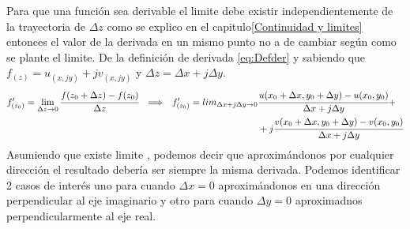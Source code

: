 Para que una función sea derivable el limite debe existir independientemente de la trayectoria de $\Delta z$ como se explico en el capitulo\ref{Continuidad y limites} entonces el valor de la derivada en un mismo punto no a de cambiar según como se plante el limite. De la definición de derivada \ref{eq:Defder} y sabiendo que  $f_{(z)}=u_{(x,jy)}+jv_{(x,jy)}$ y $\Delta z=\Delta x+j\Delta y$.
\begin{equation}
    \begin{aligned}
         f'_{(z_0)}=\lim_{\Delta z\to 0}\cfrac{f(z_0+\Delta z)-f(z_0)}{\Delta z}\hspace{0.25cm} \Longrightarrow \hspace{0.25cm} f'_{(z_0)}=lim_{\Delta x+j\Delta y \to 0}&\cfrac{u(x_0+\Delta x,y_0+\Delta y)-u(x_0,y_0)}{\Delta x+j\Delta y}+\\
                                                                                                    &+j\cfrac{v(x_0+\Delta x,y_0+\Delta y)-v(x_0,y_0)}{\Delta x+j\Delta y}
    \end{aligned}
\end{equation}
Asumiendo que existe limite , podemos decir que aproximándonos por cualquier dirección el resultado debería ser siempre la misma derivada. Podemos identificar 2 casos de interés  uno para cuando $\Delta x=0$ aproximándonos en una dirección perpendicular al eje imaginario y otro para cuando $\Delta y=0$ aproximadnos perpendicularmente al eje real.


